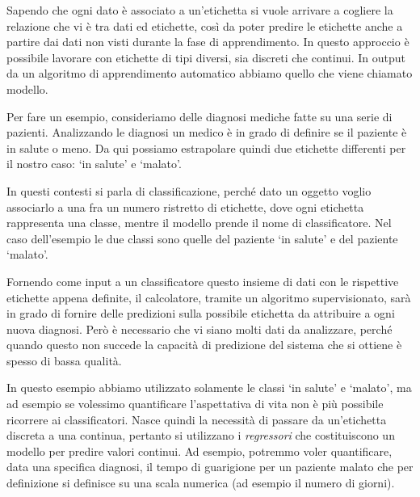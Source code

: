 \documentclass[a4paper,12pt]{report}
\begin{document}
Sapendo che ogni dato è associato a un'etichetta si vuole arrivare a cogliere la relazione che vi è tra dati ed etichette, così da poter predire le etichette anche a partire dai dati non visti durante la fase di apprendimento. 
In questo approccio è possibile lavorare con etichette di tipi diversi, sia discreti che continui.
In output da un algoritmo di apprendimento automatico abbiamo quello che viene chiamato modello. 



Per fare un esempio, consideriamo delle diagnosi mediche fatte su una serie  di pazienti. 
Analizzando le diagnosi un medico è in grado di definire se il paziente è in salute o meno. Da qui possiamo estrapolare quindi due etichette differenti per il nostro caso: `in salute' e `malato'. 

In questi contesti si parla di classificazione, perché dato un oggetto voglio associarlo a una fra un numero ristretto di etichette, dove ogni etichetta rappresenta una classe, mentre il modello prende il nome di classificatore. Nel caso dell'esempio le due classi sono quelle del paziente `in salute' e del paziente `malato'. 

Fornendo come input a un classificatore questo insieme di dati con le rispettive etichette appena definite, il calcolatore, tramite un algoritmo supervisionato, sarà in grado di fornire delle predizioni sulla possibile etichetta da attribuire a ogni nuova diagnosi.
Però è necessario che vi siano molti dati da analizzare, perché quando questo non succede la capacità di predizione del sistema che si ottiene è spesso di bassa qualità.

In questo esempio abbiamo utilizzato solamente le classi `in salute' e `malato', ma ad esempio se volessimo quantificare l'aspettativa di vita non è più possibile ricorrere ai classificatori. Nasce quindi la necessità di passare da un'etichetta discreta a una continua, pertanto si utilizzano i \textit{regressori} che costituiscono un modello per predire valori continui.
Ad esempio, potremmo voler quantificare, data una specifica diagnosi, il tempo di guarigione per un paziente malato che per definizione si definisce su una scala numerica (ad esempio il numero di giorni).
\end{document}
